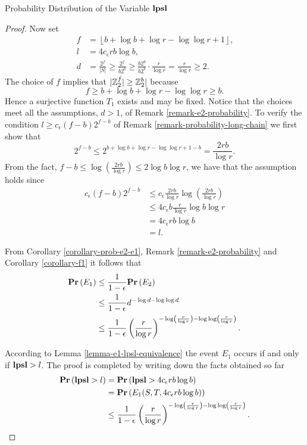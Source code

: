 \begin{section}{Probability Distribution of the Variable \texorpdfstring{$\mathbf{lpsl}$}{lpsl}}
\begin{proof}
Now set 
\[
\begin{split}
	f & = \left\lfloor b + \log b + \log r - \log \log r + 1 \right\rfloor \text{,} \\
	l & = 4c_{\epsilon}r b \log b \text{,} \\
	d & = \frac{2 ^ f}{|S|} \geq \frac{2 ^ f}{b 2 ^ b} \geq \frac{b 2 ^ b}{b 2 ^ b} \cdot \frac{r}{\log r} = \frac{r}{\log r} \geq 2 \text{.}
\end{split}
\]
The choice of $f$ implies that $|\mathbb{Z}_{2}^{f}| \geq \mathbb{Z}_{2}^{b}|$ because 
\[ 
f \geq b + \log b + \log r - \log \log r \geq b \text{.}
\]
Hence a surjective function $T_1$ exists and may be fixed. Notice that the choices meet all the assumptions, $d > 1$, of Remark \ref{remark-e2-probability}. To verify the condition $l \geq c_\epsilon (f - b) 2 ^ {f - b}$ of Remark \ref{remark-probability-long-chain} we first show that
\[
	2 ^ {f - b} \leq 2 ^ {b + \log b + \log r - \log \log r + 1 - b} = \frac{2 r b}{\log r} \text{.}
\]
From the fact, $f - b \leq \log \left(\frac{2 r b}{\log r}\right) \leq 2 \log b \log r$, we have that the assumption holds since
\[
\begin{split}
c_{\epsilon}(f - b) 2 ^ {f - b}
	& \leq c_{\epsilon} \frac{2 r b}{\log r} \log \left(\frac{2 r b}{\log r}\right) \\
	& \leq 4 c_{\epsilon} b \frac{r}{\log r} \log b \log r \\
	& = 4 c_{\epsilon} r b \log b \\
	& = l \text{.}
\end{split}
\]

From Corollary \ref{corollary-prob-e2-e1}, Remark \ref{remark-e2-probability} and Corollary \ref{corollary-f1} it follows that
\[
\begin{split}
\mathbf{Pr}\left(E_1\right)
	& \leq \frac{1}{1 - \epsilon} \mathbf{Pr}\left(E_2\right) \\
	& \leq \frac{1}{1 - \epsilon} d ^ {-\log d - \log \log d} \\ 
	& \leq \frac{1}{1 - \epsilon} \left(\frac{r}{\log r}\right)^{-\log \left(\frac{r}{\log r}\right) - \log \log \left(\frac{r}{\log r}\right)} \text{.}
\end{split}
\]

According to Lemma \ref{lemma-e1-lpsl-equivalence} the event $E_1$ occurs if and only if $\mathbf{lpsl} > l$. The proof is completed by writing down the facts obtained so far
\[
\begin{split}
\mathbf{Pr}\left(\mathbf{lpsl} > l\right) 
	& = \mathbf{Pr}\left(\mathbf{lpsl} > 4c_{\epsilon} r b \log b\right) \\
	& = \mathbf{Pr}\left(E_1(S, T, 4c_{\epsilon} r b \log b)\right) \\
	& \leq \frac{1}{1 - \epsilon} \left(\frac{r}{\log r}\right)^{-\log \left(\frac{r}{\log r}\right) - \log \log \left(\frac{r}{\log r}\right)} \text{.}
\end{split}
\]
\end{proof}


\end{section}
